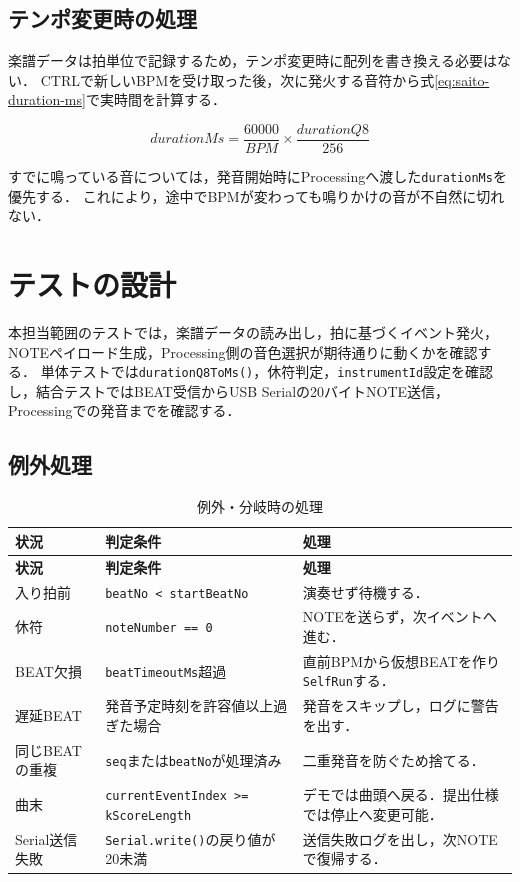 \documentclass[lualatex,book,paper=a4paper,jafontsize=11.5pt,jafontscale=1.05]{jlreq}
\newcommand{\code}[1]{\texttt{#1}}
\begin{document}
\subsection{テンポ変更時の処理}

楽譜データは拍単位で記録するため，テンポ変更時に配列を書き換える必要はない．
CTRLで新しいBPMを受け取った後，次に発火する音符から式\ref{eq:saito-duration-ms}で実時間を計算する．

\begin{equation}
\label{eq:saito-duration-ms}
durationMs = \frac{60000}{BPM} \times \frac{durationQ8}{256}
\end{equation}

すでに鳴っている音については，発音開始時にProcessingへ渡した\code{durationMs}を優先する．
これにより，途中でBPMが変わっても鳴りかけの音が不自然に切れない．

\section{テストの設計}

本担当範囲のテストでは，楽譜データの読み出し，拍に基づくイベント発火，NOTEペイロード生成，Processing側の音色選択が期待通りに動くかを確認する．
単体テストでは\code{durationQ8ToMs()}，休符判定，\code{instrumentId}設定を確認し，結合テストではBEAT受信からUSB Serialの20バイトNOTE送信，Processingでの発音までを確認する．

\subsection{例外処理}

\begin{longtable}{p{}p{}p{}}
\caption{例外・分岐時の処理}\label{tab:saito-exceptions}\\
\toprule
\textbf{状況} & \textbf{判定条件} & \textbf{処理} \\
\midrule
\endfirsthead
\toprule
\textbf{状況} & \textbf{判定条件} & \textbf{処理} \\
\midrule
\endhead
入り拍前 & \code{beatNo < startBeatNo} & 演奏せず待機する．\\
休符 & \code{noteNumber == 0} & NOTEを送らず，次イベントへ進む．\\
BEAT欠損 & \code{beatTimeoutMs}超過 & 直前BPMから仮想BEATを作り\code{SelfRun}する．\\
遅延BEAT & 発音予定時刻を許容値以上過ぎた場合 & 発音をスキップし，ログに警告を出す．\\
同じBEATの重複 & \code{seq}または\code{beatNo}が処理済み & 二重発音を防ぐため捨てる．\\
曲末 & \code{currentEventIndex >= kScoreLength} & デモでは曲頭へ戻る．提出仕様では停止へ変更可能．\\
Serial送信失敗 & \code{Serial.write()}の戻り値が20未満 & 送信失敗ログを出し，次NOTEで復帰する．\\
\bottomrule
\end{longtable}
\end{document}

